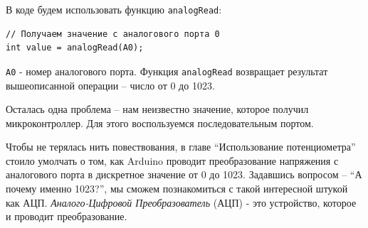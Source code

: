 \documentclass[a4paper,twoside]{book}
\begin{document}
В коде будем использовать функцию \texttt{analogRead}:

\begin{verbatim}
// Получаем значение с аналогового порта 0
int value = analogRead(A0);
\end{verbatim}

\texttt{A0} - номер аналогового порта. Функция \texttt{analogRead} возвращает
результат вышеописанной операции -- число от 0 до 1023.

Осталась одна проблема -- нам неизвестно значение, которое получил
микроконтроллер. Для этого воспользуемся последовательным портом.



Чтобы не терялась нить повествования, в главе ``Использование потенциометра''
стоило умолчать о том, как Arduino проводит преобразование напряжения с
аналогового порта в дискретное значение от 0 до 1023. Задавшись вопросом -- ``А
почему именно 1023?'', мы сможем познакомиться с такой интересной штукой как
АЦП. \emph{Аналого-Цифровой Преобразователь} (АЦП) - это устройство, которое и
проводит преобразование.
\end{document}
